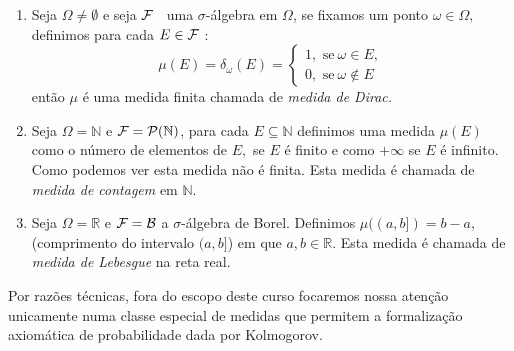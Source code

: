 \begin{frame}
\begin{exem}

\begin{enumerate}
\item  Seja $\Omega \neq \emptyset $ e seja ${\cal F}$ $\ $ uma $\sigma$-álgebra em $\Omega $, se fixamos um ponto $\omega\in \Omega ,$ definimos para cada $E\in {\cal F}$ : 
\begin{equation*}
\mu (E)=\delta_{\omega}(E)=\left\{ 
\begin{array}{c}
1,\text{ se}\ \omega\in E, \\
0,\text{ se} \ \omega\notin E
\end{array}
\right.
\end{equation*} então $\mu $ é uma medida finita chamada de \emph{ medida de Dirac.}

\item  Seja $\Omega =\mathbb{N}$ e ${\cal F}=\mathcal{P}(\mathbb{N})$, para
cada $E\subseteq \mathbb{N}$ definimos uma medida $\mu (E)$ como o
n\'{u}mero de elementos de $E,$ se $E$  é finito e como $+\infty $ se $E$ é
infinito. Como podemos ver esta medida não é finita. Esta medida é chamada de \emph{medida de contagem} em  $\mathbb{N}.$

\item Seja $\Omega =\mathbb{R}$ e ${\cal F} = {\cal B}$ a $\sigma$-álgebra de Borel. Definimos $\mu((a, b]) = b - a$, (comprimento do
intervalo $(a,b]$) em que $a, b \in  \mathbb{R}.$ Esta medida é chamada de {\it medida de Lebesgue} na reta real.

\end{enumerate}
\end{exem}
Por razões técnicas, fora do escopo deste curso focaremos nossa atenção unicamente numa classe especial de medidas que permitem a formalização axiomática de probabilidade dada por Kolmogorov.

\end{frame}




